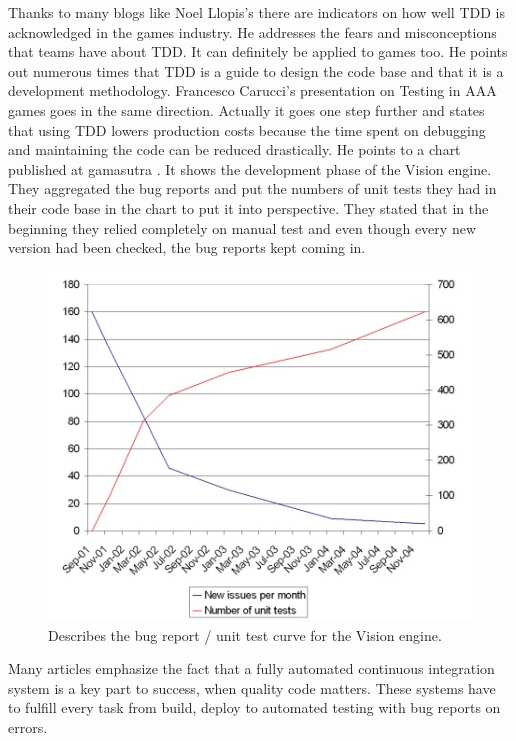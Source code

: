     Thanks to many blogs like Noel Llopis's \cite[]{noel:testingBlog} there are indicators on how well TDD is acknowledged in the games industry. He addresses the fears and misconceptions that teams have about TDD. It can definitely be applied to games too. He points out numerous times that TDD is a guide to design the code base and that it is a development methodology. Francesco Carucci's presentation \cite{crytek:aaatesting} on Testing in AAA games goes in the same direction. Actually it goes one step further and states that using TDD lowers production costs because the time spent on debugging and maintaining the code can be reduced drastically. He points to a chart published at gamasutra \cite{gamasutra:automatedTests}. It shows the development phase of the Vision engine. They aggregated the bug reports and put the numbers of unit tests they had in their code base in the chart to put it into perspective. They stated that in the beginning they relied completely on manual test and even though every new version had been checked, the bug reports kept coming in.  
        \begin{figure}[hbtp]
        \centering
        \includegraphics[width=0.95\columnwidth]{img/unittestissues.jpg}
        \caption{Describes the bug report / unit test curve for the Vision engine.}
        \label{fig:BugReportRatio}
    \end{figure}
    Many articles emphasize the fact that a fully automated continuous integration system is a key part to success, when quality code matters. These systems have to fulfill every task from build, deploy to automated testing with bug reports on errors. 
